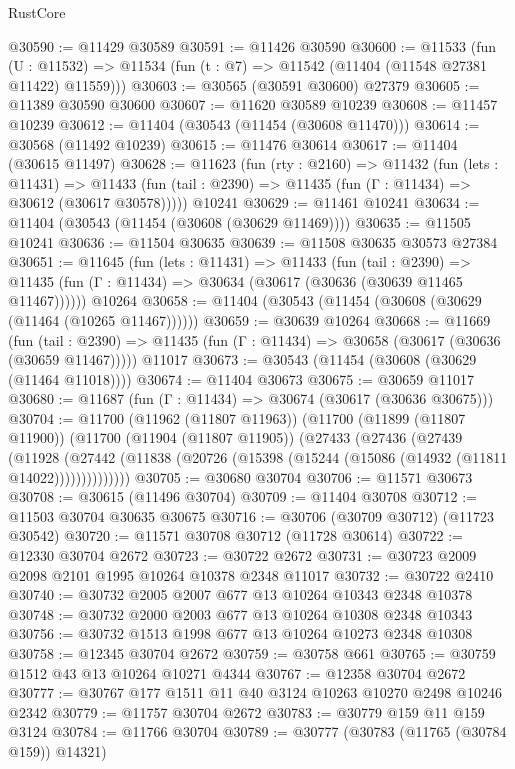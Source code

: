 \begin{lexlean}{RustCore}
\begin{coremodule}
@30590 := @11429 @30589
@30591 := @11426 @30590
@30600 := @11533
    (fun (U : @11532) => @11534 (fun (t : @7) => @11542 (@11404 (@11548 @27381 @11422) @11559)))
@30603 := @30565 (@30591 @30600) @27379
@30605 := @11389 @30590 @30600
@30607 := @11620 @30589 @10239
@30608 := @11457 @10239
@30612 := @11404 (@30543 (@11454 (@30608 @11470)))
@30614 := @30568 (@11492 @10239)
@30615 := @11476 @30614
@30617 := @11404 (@30615 @11497)
@30628 := @11623
    (fun (rty : @2160) =>
    @11432
      (fun (lets : @11431) =>
      @11433 (fun (tail : @2390) => @11435 (fun (Γ : @11434) => @30612 (@30617 @30578)))))
    @10241
@30629 := @11461 @10241
@30634 := @11404 (@30543 (@11454 (@30608 (@30629 @11469))))
@30635 := @11505 @10241
@30636 := @11504 @30635
@30639 := @11508 @30635 @30573 @27384
@30651 := @11645
    (fun (lets : @11431) =>
    @11433
      (fun (tail : @2390) =>
      @11435 (fun (Γ : @11434) => @30634 (@30617 (@30636 (@30639 @11465 @11467))))))
    @10264
@30658 := @11404 (@30543 (@11454 (@30608 (@30629 (@11464 (@10265 @11467))))))
@30659 := @30639 @10264
@30668 := @11669
    (fun (tail : @2390) => @11435 (fun (Γ : @11434) => @30658 (@30617 (@30636 (@30659 @11467)))))
    @11017
@30673 := @30543 (@11454 (@30608 (@30629 (@11464 @11018))))
@30674 := @11404 @30673
@30675 := @30659 @11017
@30680 := @11687 (fun (Γ : @11434) => @30674 (@30617 (@30636 @30675)))
@30704 := @11700
    (@11962 (@11807 @11963))
    (@11700
      (@11899 (@11807 @11900))
      (@11700
        (@11904 (@11807 @11905))
        (@27433
          (@27436
            (@27439
              (@11928
                (@27442 (@11838 (@20726 (@15398 (@15244 (@15086 (@14932 (@11811 @14022))))))))))))))
@30705 := @30680 @30704
@30706 := @11571 @30673
@30708 := @30615 (@11496 @30704)
@30709 := @11404 @30708
@30712 := @11503 @30704 @30635 @30675
@30716 := @30706 (@30709 @30712) (@11723 @30542)
@30720 := @11571 @30708 @30712 (@11728 @30614)
@30722 := @12330 @30704 @2672
@30723 := @30722 @2672
@30731 := @30723 @2009 @2098 @2101 @1995 @10264 @10378 @2348 @11017
@30732 := @30722 @2410
@30740 := @30732 @2005 @2007 @677 @13 @10264 @10343 @2348 @10378
@30748 := @30732 @2000 @2003 @677 @13 @10264 @10308 @2348 @10343
@30756 := @30732 @1513 @1998 @677 @13 @10264 @10273 @2348 @10308
@30758 := @12345 @30704 @2672
@30759 := @30758 @661
@30765 := @30759 @1512 @43 @13 @10264 @10271 @4344
@30767 := @12358 @30704 @2672
@30777 := @30767 @177 @1511 @11 @40 @3124 @10263 @10270 @2498 @10246 @2342
@30779 := @11757 @30704 @2672
@30783 := @30779 @159 @11 @159 @3124
@30784 := @11766 @30704
@30789 := @30777 (@30783 (@11765 (@30784 @159)) @14321)

\end{coremodule}
\end{lexlean}
